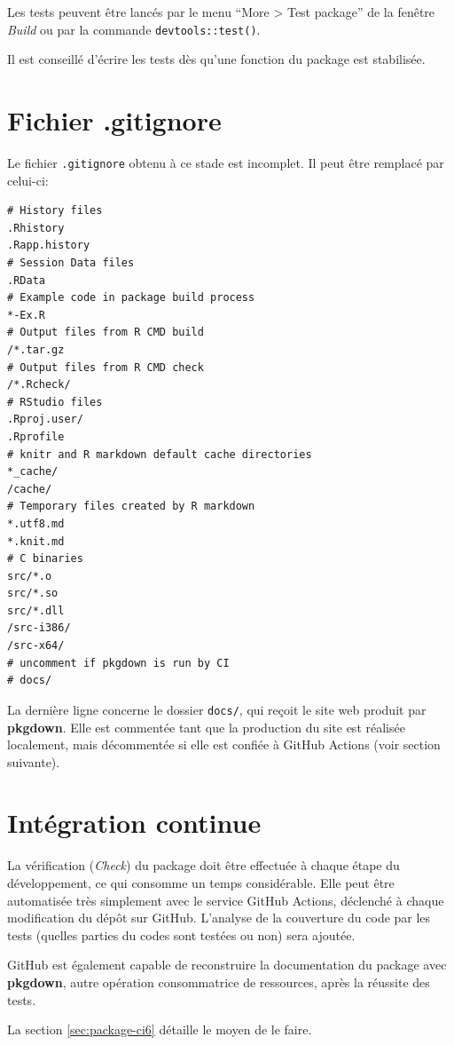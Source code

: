 \documentclass[
  11pt,
  french,
  a4paper,
  extrafontsizes,onecolumn,openright
  ]{memoir}
\begin{document}
Les tests peuvent être lancés par le menu ``More \textgreater{} Test package'' de la fenêtre \emph{Build} ou par la commande \texttt{devtools::test()}.

Il est conseillé d'écrire les tests dès qu'une fonction du package est stabilisée.

\hypertarget{fichier-.gitignore}{%
\section{Fichier .gitignore}\label{fichier-.gitignore}}

Le fichier \texttt{.gitignore} obtenu à ce stade est incomplet.
Il peut être remplacé par celui-ci:

\begin{verbatim}
# History files
.Rhistory
.Rapp.history
# Session Data files
.RData
# Example code in package build process
*-Ex.R
# Output files from R CMD build
/*.tar.gz
# Output files from R CMD check
/*.Rcheck/
# RStudio files
.Rproj.user/
.Rprofile
# knitr and R markdown default cache directories
*_cache/
/cache/
# Temporary files created by R markdown
*.utf8.md
*.knit.md
# C binaries
src/*.o
src/*.so
src/*.dll
/src-i386/
/src-x64/
# uncomment if pkgdown is run by CI
# docs/
\end{verbatim}

La dernière ligne concerne le dossier \texttt{docs/}, qui reçoit le site web produit par \textbf{pkgdown}.
Elle est commentée tant que la production du site est réalisée localement, mais décommentée si elle est confiée à GitHub Actions (voir section suivante).

\hypertarget{sec:package-ci5}{%
\section{Intégration continue}\label{sec:package-ci5}}

La vérification (\emph{Check}) du package doit être effectuée à chaque étape du développement, ce qui consomme un temps considérable.
Elle peut être automatisée très simplement avec le service GitHub Actions, déclenché à chaque modification du dépôt sur GitHub.
L'analyse de la couverture du code par les tests (quelles parties du codes sont testées ou non) sera ajoutée.

GitHub est également capable de reconstruire la documentation du package avec \textbf{pkgdown}, autre opération consommatrice de ressources, après la réussite des tests.

La section \ref{sec:package-ci6} détaille le moyen de le faire.
\end{document}
